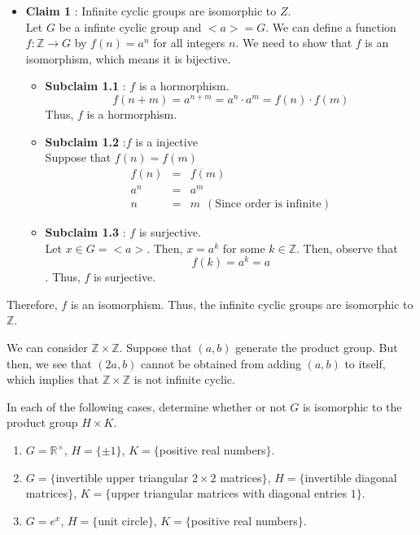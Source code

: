 \documentclass[
]{book}
\providecommand{\tightlist}{%
  \setlength{\itemsep}{0pt}\setlength{\parskip}{0pt}}
\begin{document}
\begin{itemize}
\item
  \textbf{Claim 1} : Infinite cyclic groups are isomorphic to \(Z\).\\
  Let \(G\) be a infinte cyclic group and \(<a>=G\). We can define a
  function \(f: \mathbb{Z} \rightarrow G\) by \(f(n) = a^n\) for all
  integers \(n\). We need to show that \(f\) is an isomorphism, which
  means it is bijective.

  \begin{itemize}
  \tightlist
  \item
    \textbf{Subclaim 1.1} : \(f\) is a hormorphism.\\
    \[f(n+m)=a^{n+m}=a^n \cdot a^m =f(n)\cdot f(m)\] Thus, \(f\) is a
    hormorphism.
  \item
    \textbf{Subclaim 1.2} :\(f\) is a injective\\
    Suppose that \(f(n)=f(m)\) \begin{eqnarray}
      f(n)&=&f(m)\\
      a^n &=& a^m \\
      n&=& m ~~(\text{Since order is infinite})
    \end{eqnarray}
  \item
    \textbf{Subclaim 1.3} : \(f\) is surjective.\\
    Let \(x\in G=<a>\). Then, \(x=a^k\) for some \(k\in \mathbb{Z}\).
    Then, observe that \[f(k)=a^k=a \]. Thus, \(f\) is surjective.
  \end{itemize}
\end{itemize}

Therefore, \(f\) is an isomorphism. Thus, the infinite cyclic groups are
isomorphic to \(\mathbb{Z}\).

We can consider \(\mathbb{Z}\times \mathbb{Z}\). Suppose that \((a, b)\)
generate the product group. But then, we see that \((2a, b)\) cannot be
obtained from adding \((a, b)\) to itself, which implies that
\(\mathbb{Z}\times \mathbb{Z}\) is not infinite cyclic.

\leavevmode{}%
In each of the following cases, determine whether or not \(G\) is
isomorphic to the product group \(H \times K\).

\begin{enumerate}
\def\labelenumi{(\alph{enumi})}
\item
  \(G = \mathbb{R}^\times\), \(H = \{\pm 1\}\), \(K = \{\)positive real
  numbers\(\}\).
\item
  \(G = \{\)invertible upper triangular \(2 \times 2\) matrices\(\}\),
  \(H = \{\)invertible diagonal matrices\(\}\), \(K = \{\)upper
  triangular matrices with diagonal entries \(1\}\).
\item
  \(G = e^x\), \(H = \{\)unit circle\(\}\), \(K = \{\)positive real
  numbers\(\}\).
\end{enumerate}
\end{document}
